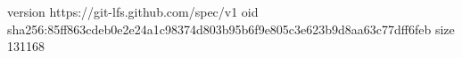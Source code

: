 version https://git-lfs.github.com/spec/v1
oid sha256:85ff863cdeb0e2e24a1c98374d803b95b6f9e805c3e623b9d8aa63c77dff6feb
size 131168

